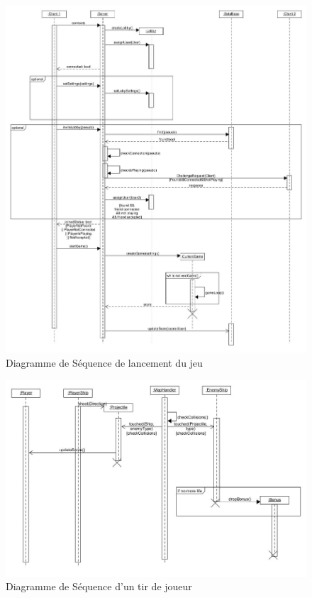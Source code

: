 \documentclass[a4paper,12pt]{article}
\begin{document}
\begin{figure}[hbtp]
\centering
\includegraphics[scale=0.3]{images/sequence_diagram_StartGame}
\caption{Diagramme de Séquence de lancement du jeu}
\end{figure}

\begin{figure}[hbtp]
\centering
\includegraphics[scale=0.3]{images/player_shooting.jpg}
\caption{Diagramme de Séquence d'un tir de joueur}
\end{figure}
\end{document}
